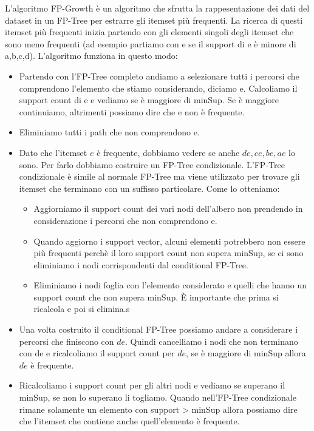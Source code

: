 \documentclass[14pt]{extreport}
\begin{document}
L'algoritmo FP-Growth è un algoritmo che sfrutta la rappesentazione dei dati del dataset in un FP-Tree per estrarre gli itemset più frequenti.
La ricerca di questi itemset più frequenti inizia partendo con gli elementi singoli degli itemset che sono meno frequenti (ad esempio partiamo con e se il support di e è minore di a,b,c,d).
L'algoritmo funziona in questo modo:

\begin{itemize}
    \item Partendo con l'FP-Tree completo andiamo a selezionare tutti i percorsi che comprendono l'elemento che stiamo considerando, diciamo e. Calcoliamo il support count di e e vediamo se è maggiore di minSup. Se è maggiore continuiamo, altrimenti possiamo dire che e non è frequente.
    \item Eliminiamo tutti i path che non comprendono e.
    \item Dato che l'itemset ${e}$ è frequente, dobbiamo vedere se anche ${de,ce,be,ae}$ lo sono. Per farlo dobbiamo costruire un FP-Tree condizionale.
    L'FP-Tree condizionale è simile al normale FP-Tree ma viene utilizzato per trovare gli itemset che terminano con un suffisso particolare.
    Come lo otteniamo:
        \begin{itemize}
            \item Aggiorniamo il support count dei vari nodi dell'albero non prendendo in considerazione i percorsi che non comprendono e.
            \item Quando aggiorno i support vector, alcuni elementi potrebbero non essere più frequenti perchè il loro support count non supera minSup, se ci sono eliminiamo i nodi corrispondenti dal conditional FP-Tree.
            \item Eliminiamo i nodi foglia con l'elemento considerato e quelli che hanno un support count che non supera minSup.
            È importante che prima si ricalcola e poi si elimina.s
        \end{itemize}
    \item Una volta costruito il conditional FP-Tree possiamo andare a considerare i percorsi che finiscono con ${de}$. Quindi cancelliamo i nodi che non terminano con de e ricalcoliamo il support count per ${de}$, se è maggiore di minSup allora ${de}$ è frequente.
    \item Ricalcoliamo i support count per gli altri nodi e vediamo se superano il minSup, se non lo superano li togliamo. Quando nell'FP-Tree condizionale rimane solamente un elemento con support > minSup allora possiamo dire che l'itemset che contiene anche quell'elemento è frequente.
\end{itemize}
\end{document}
